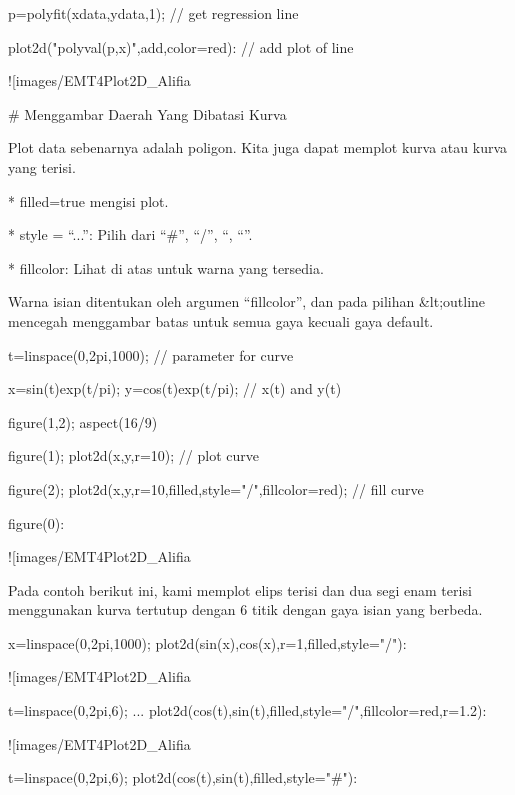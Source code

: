 \documentclass{article}
\begin{document}
\>p=polyfit(xdata,ydata,1); // get regression line

\>plot2d("polyval(p,x)",\>add,color=red): // add plot of line


![images/EMT4Plot2D_Alifia%

# Menggambar Daerah Yang Dibatasi Kurva

Plot data sebenarnya adalah poligon. Kita juga dapat memplot kurva
atau kurva yang terisi.


* 
filled=true mengisi plot.

* 
style = “...”: Pilih dari “#”, “/”, “\”, “\/”.

* 
fillcolor: Lihat di atas untuk warna yang tersedia.


Warna isian ditentukan oleh argumen “fillcolor”, dan pada pilihan
&lt;outline mencegah menggambar batas untuk semua gaya kecuali gaya
default.


\>t=linspace(0,2pi,1000); // parameter for curve

\>x=sin(t)\*exp(t/pi); y=cos(t)\*exp(t/pi); // x(t) and y(t)

\>figure(1,2); aspect(16/9)

\>figure(1); plot2d(x,y,r=10); // plot curve

\>figure(2); plot2d(x,y,r=10,\>filled,style="/",fillcolor=red); // fill curve

\>figure(0):


![images/EMT4Plot2D_Alifia%

Pada contoh berikut ini, kami memplot elips terisi dan dua segi enam
terisi menggunakan kurva tertutup dengan 6 titik dengan gaya isian
yang berbeda.


\>x=linspace(0,2pi,1000); plot2d(sin(x),cos(x),r=1,\>filled,style="/"):


![images/EMT4Plot2D_Alifia%

\>t=linspace(0,2pi,6); ...  
\>   plot2d(cos(t),sin(t),\>filled,style="/",fillcolor=red,r=1.2):


![images/EMT4Plot2D_Alifia%

\>t=linspace(0,2pi,6); plot2d(cos(t),sin(t),\>filled,style="#"):
\end{document}
